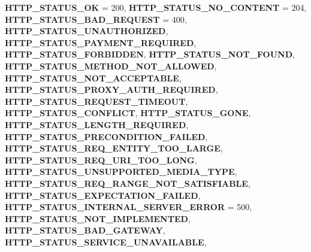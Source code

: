 \begin{DoxyCompactItemize}
{\bfseries H\+T\+T\+P\+\_\+\+S\+T\+A\+T\+U\+S\+\_\+\+OK} = 200, 
{\bfseries H\+T\+T\+P\+\_\+\+S\+T\+A\+T\+U\+S\+\_\+\+N\+O\+\_\+\+C\+O\+N\+T\+E\+NT} = 204, 
{\bfseries H\+T\+T\+P\+\_\+\+S\+T\+A\+T\+U\+S\+\_\+\+B\+A\+D\+\_\+\+R\+E\+Q\+U\+E\+ST} = 400, 
{\bfseries H\+T\+T\+P\+\_\+\+S\+T\+A\+T\+U\+S\+\_\+\+U\+N\+A\+U\+T\+H\+O\+R\+I\+Z\+ED}, 
\newline
{\bfseries H\+T\+T\+P\+\_\+\+S\+T\+A\+T\+U\+S\+\_\+\+P\+A\+Y\+M\+E\+N\+T\+\_\+\+R\+E\+Q\+U\+I\+R\+ED}, 
{\bfseries H\+T\+T\+P\+\_\+\+S\+T\+A\+T\+U\+S\+\_\+\+F\+O\+R\+B\+I\+D\+D\+EN}, 
{\bfseries H\+T\+T\+P\+\_\+\+S\+T\+A\+T\+U\+S\+\_\+\+N\+O\+T\+\_\+\+F\+O\+U\+ND}, 
{\bfseries H\+T\+T\+P\+\_\+\+S\+T\+A\+T\+U\+S\+\_\+\+M\+E\+T\+H\+O\+D\+\_\+\+N\+O\+T\+\_\+\+A\+L\+L\+O\+W\+ED}, 
\newline
{\bfseries H\+T\+T\+P\+\_\+\+S\+T\+A\+T\+U\+S\+\_\+\+N\+O\+T\+\_\+\+A\+C\+C\+E\+P\+T\+A\+B\+LE}, 
{\bfseries H\+T\+T\+P\+\_\+\+S\+T\+A\+T\+U\+S\+\_\+\+P\+R\+O\+X\+Y\+\_\+\+A\+U\+T\+H\+\_\+\+R\+E\+Q\+U\+I\+R\+ED}, 
{\bfseries H\+T\+T\+P\+\_\+\+S\+T\+A\+T\+U\+S\+\_\+\+R\+E\+Q\+U\+E\+S\+T\+\_\+\+T\+I\+M\+E\+O\+UT}, 
{\bfseries H\+T\+T\+P\+\_\+\+S\+T\+A\+T\+U\+S\+\_\+\+C\+O\+N\+F\+L\+I\+CT}, 
\newline
{\bfseries H\+T\+T\+P\+\_\+\+S\+T\+A\+T\+U\+S\+\_\+\+G\+O\+NE}, 
{\bfseries H\+T\+T\+P\+\_\+\+S\+T\+A\+T\+U\+S\+\_\+\+L\+E\+N\+G\+T\+H\+\_\+\+R\+E\+Q\+U\+I\+R\+ED}, 
{\bfseries H\+T\+T\+P\+\_\+\+S\+T\+A\+T\+U\+S\+\_\+\+P\+R\+E\+C\+O\+N\+D\+I\+T\+I\+O\+N\+\_\+\+F\+A\+I\+L\+ED}, 
{\bfseries H\+T\+T\+P\+\_\+\+S\+T\+A\+T\+U\+S\+\_\+\+R\+E\+Q\+\_\+\+E\+N\+T\+I\+T\+Y\+\_\+\+T\+O\+O\+\_\+\+L\+A\+R\+GE}, 
\newline
{\bfseries H\+T\+T\+P\+\_\+\+S\+T\+A\+T\+U\+S\+\_\+\+R\+E\+Q\+\_\+\+U\+R\+I\+\_\+\+T\+O\+O\+\_\+\+L\+O\+NG}, 
{\bfseries H\+T\+T\+P\+\_\+\+S\+T\+A\+T\+U\+S\+\_\+\+U\+N\+S\+U\+P\+P\+O\+R\+T\+E\+D\+\_\+\+M\+E\+D\+I\+A\+\_\+\+T\+Y\+PE}, 
{\bfseries H\+T\+T\+P\+\_\+\+S\+T\+A\+T\+U\+S\+\_\+\+R\+E\+Q\+\_\+\+R\+A\+N\+G\+E\+\_\+\+N\+O\+T\+\_\+\+S\+A\+T\+I\+S\+F\+I\+A\+B\+LE}, 
{\bfseries H\+T\+T\+P\+\_\+\+S\+T\+A\+T\+U\+S\+\_\+\+E\+X\+P\+E\+C\+T\+A\+T\+I\+O\+N\+\_\+\+F\+A\+I\+L\+ED}, 
\newline
{\bfseries H\+T\+T\+P\+\_\+\+S\+T\+A\+T\+U\+S\+\_\+\+I\+N\+T\+E\+R\+N\+A\+L\+\_\+\+S\+E\+R\+V\+E\+R\+\_\+\+E\+R\+R\+OR} = 500, 
{\bfseries H\+T\+T\+P\+\_\+\+S\+T\+A\+T\+U\+S\+\_\+\+N\+O\+T\+\_\+\+I\+M\+P\+L\+E\+M\+E\+N\+T\+ED}, 
{\bfseries H\+T\+T\+P\+\_\+\+S\+T\+A\+T\+U\+S\+\_\+\+B\+A\+D\+\_\+\+G\+A\+T\+E\+W\+AY}, 
{\bfseries H\+T\+T\+P\+\_\+\+S\+T\+A\+T\+U\+S\+\_\+\+S\+E\+R\+V\+I\+C\+E\+\_\+\+U\+N\+A\+V\+A\+I\+L\+A\+B\+LE}, 

\end{DoxyCompactItemize}
